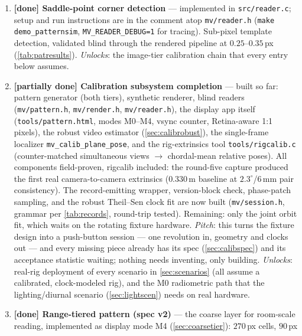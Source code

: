 \documentclass[11pt]{article}
\theoremstyle{definition}
\newcommand{\code}[1]{\texttt{#1}}
\begin{document}
\begin{enumerate}
  \item \textbf{[done] Saddle-point corner detection} --- implemented
        in \code{src/reader.c}; setup and run instructions are in the
        comment atop \code{mv/reader.h} (\code{make demo\_patternsim},
        \code{MV\_READER\_DEBUG=1} for tracing). Sub-pixel template
        detection, validated blind through the rendered pipeline at
        $0.25$--$0.35$\,px (\autoref{tab:patresults}).
        \emph{Unlocks}: the image-tier calibration chain that every
        entry below assumes.
  \item \textbf{[partially done] Calibration subsystem completion} ---
        built so far: pattern generator (both tiers), synthetic
        renderer, blind readers (\code{mv/pattern.h},
        \code{mv/render.h}, \code{mv/reader.h}), the display app
        itself (\code{tools/pattern.html}, modes M0--M4, vsync
        counter, Retina-aware 1:1 pixels), the robust video estimator
        (\autoref{sec:calibrobust}), the single-frame localizer
        \code{mv\_calib\_plane\_pose}, and the rig-extrinsics tool
        \code{tools/rigcalib.c} (counter-matched simultaneous views
        $\to$ chordal-mean relative poses). All components field-proven,
        rigcalib included: the round-five capture produced the first
        real camera-to-camera extrinsics ($0.330$\,m baseline at
        $2.3^\circ$/$6$\,mm pair consistency). The record-emitting wrapper, version-block
        check, phase-patch sampling, and the robust Theil--Sen clock
        fit are now built (\code{mv/session.h}, grammar per
        \autoref{tab:records}, round-trip tested). Remaining: only
        the joint orbit fit, which waits on the rotating fixture
        hardware.
        \emph{Pitch}: this turns the fixture design into a push-button
        session --- one revolution in, geometry and clocks out --- and
        every missing piece already has its spec (\autoref{sec:calibspec})
        and its acceptance statistic waiting; nothing needs inventing,
        only building. \emph{Unlocks}: real-rig deployment of every
        scenario in \autoref{sec:scenarios} (all assume a calibrated,
        clock-modeled rig), and the M0 radiometric path that the
        lighting/diurnal scenario (\autoref{sec:lightscen}) needs on
        real hardware.
  \item \textbf{[done] Range-tiered pattern (spec v2)} --- the
        coarse layer for room-scale reading, implemented as display
        mode M4 (\autoref{sec:coarsetier}): $270$\,px cells, $90$\,px

\end{enumerate}
\end{document}
